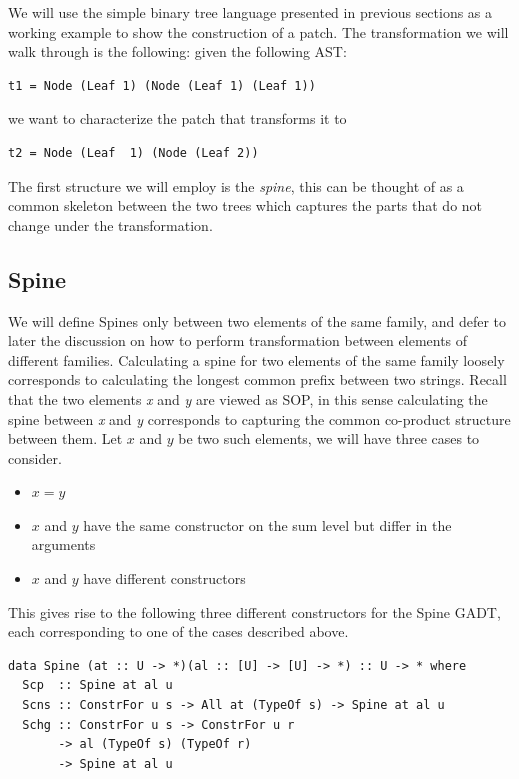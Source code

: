 \documentclass[11pt, titlepage]{article}
\begin{document}
We will use the simple binary tree language presented in previous sections as a 
working example to show the construction of a patch. The transformation we will walk through is the following:
given the following AST:
\begin{verbatim}
t1 = Node (Leaf 1) (Node (Leaf 1) (Leaf 1))
\end{verbatim}
we want to characterize the patch that transforms it to 
\begin{verbatim}
t2 = Node (Leaf  1) (Node (Leaf 2))
\end{verbatim}

The first structure we will employ is the \emph{spine}, this can be thought of as a common skeleton between 
the two trees which captures the parts that do not change under the transformation.

\subsection{Spine}\label{spine}

We will define Spines only between two elements of the same family, and defer to later the discussion on how
to perform transformation between elements of different families. Calculating a spine for two elements of the same family
loosely corresponds to calculating the longest common prefix between two strings. Recall that the two 
elements \emph{x} and \emph{y} are viewed as SOP, in this sense calculating the
spine between \emph{x} and \emph{y} corresponds to capturing the common
co-product structure between them. Let $x$ and $y$ be two such elements, we will have three cases to
consider. 
\begin{itemize}
  \item $x = y$
  \item $x$ and $y$ have the same constructor on the sum level but differ in the 
  arguments
  \item $x$ and $y$ have different constructors
\end{itemize}

This gives rise
to the following three different constructors for the Spine GADT, each
corresponding to one of the cases described above.

\begin{verbatim}
data Spine (at :: U -> *)(al :: [U] -> [U] -> *) :: U -> * where
  Scp  :: Spine at al u
  Scns :: ConstrFor u s -> All at (TypeOf s) -> Spine at al u
  Schg :: ConstrFor u s -> ConstrFor u r
       -> al (TypeOf s) (TypeOf r)
       -> Spine at al u
\end{verbatim}
\end{document}
